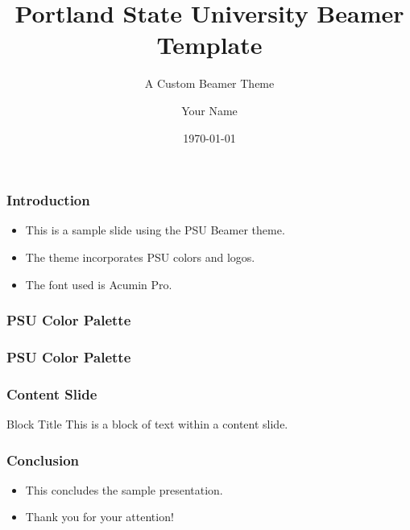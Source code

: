 \documentclass{beamer}
\title{Portland State University Beamer Template}
\subtitle{A Custom Beamer Theme}
\author{Your Name}
\institute{Portland State University}
\date{\today}
\begin{document}
    {
    \begin{frame}
		\titlepage
	\end{frame}
    }

	\begin{frame}
		\frametitle{Introduction}
		\begin{itemize}
			\item This is a sample slide using the PSU Beamer theme.

			\item The theme incorporates PSU colors and logos.

			\item The font used is Acumin Pro.
		\end{itemize}
	\end{frame}

	\begin{frame}
		\frametitle{PSU Color Palette}
		\showPSUColorsPrimary
	\end{frame}

	\begin{frame}
		\frametitle{PSU Color Palette}
		\showPSUColorsSecondary
	\end{frame}

	\begin{frame}
		\frametitle{Content Slide}
		\begin{block}{Block Title}
			This is a block of text within a content slide.
		\end{block}
	\end{frame}


	\begin{frame}
		\frametitle{Conclusion}
		\begin{itemize}
			\item This concludes the sample presentation.

			\item Thank you for your attention!
		\end{itemize}
	\end{frame}
\end{document}
